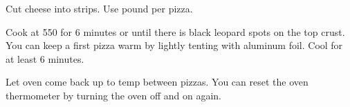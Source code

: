 \begin{recipe}

Cut cheese into strips. Use  pound per pizza. 

Cook at 550\degree{} for 6 minutes or until there is black leopard spots on the top crust. You can keep a first pizza warm by lightly tenting with aluminum foil. Cool for at least 6 minutes.  

Let oven come back up to temp between pizzas. You can reset the oven thermometer by turning the oven off and on again.

\end{recipe}
